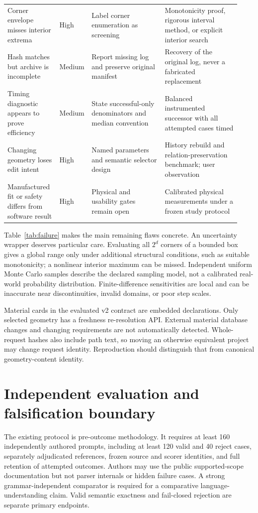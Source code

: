 \documentclass[10pt]{article}
\newcommand{\code}[1]{\texttt{\detokenize{#1}}}
\begin{document}
\begin{longtable}{>{\raggedright\arraybackslash}p{0.22\linewidth}>{\raggedright\arraybackslash}p{0.08\linewidth}>{\raggedright\arraybackslash}p{0.31\linewidth}>{\raggedright\arraybackslash}p{0.32\linewidth}}
Corner envelope misses interior extrema &
High & Label corner enumeration as screening &
Monotonicity proof, rigorous interval method, or explicit interior search \\
Hash matches but archive is incomplete &
Medium & Report missing log and preserve original manifest &
Recovery of the original log, never a fabricated replacement \\
Timing diagnostic appears to prove efficiency &
Medium & State successful-only denominators and median convention &
Balanced instrumented successor with all attempted cases timed \\
Changing geometry loses edit intent &
High & Named parameters and semantic selector design &
History rebuild and relation-preservation benchmark; user observation \\
Manufactured fit or safety differs from software result &
High & Physical and usability gates remain open &
Calibrated physical measurements under a frozen study protocol \\
\end{longtable}
\endgroup

Table~\ref{tab:failure} makes the main remaining flaws concrete. An
uncertainty wrapper deserves particular care. Evaluating all \(2^d\) corners
of a bounded box gives a global range only under additional structural
conditions, such as suitable monotonicity; a nonlinear interior maximum can
be missed. Independent uniform Monte Carlo samples describe the declared
sampling model, not a calibrated real-world probability distribution.
Finite-difference sensitivities are local and can be inaccurate near
discontinuities, invalid domains, or poor step scales.

Material cards in the evaluated v2 contract are embedded declarations.
Only selected geometry has a freshness re-resolution API. External material
database changes and changing requirements are not automatically detected.
Whole-request hashes also include path text, so moving an otherwise
equivalent project may change request identity. Reproduction should distinguish
that from canonical geometry-content identity.

\section{Independent evaluation and falsification boundary}

The existing \code{NC-EXT-EVAL-V0} protocol is pre-outcome methodology. It
requires at least 160 independently authored prompts, including at least
120 valid and 40 reject cases, separately adjudicated references, frozen
source and scorer identities, and full retention of attempted outcomes.
Authors may use the public supported-scope documentation but not parser
internals or hidden failure cases. A strong grammar-independent comparator
is required for a comparative language-understanding claim. Valid semantic
exactness and fail-closed rejection are separate primary endpoints.
\end{document}
